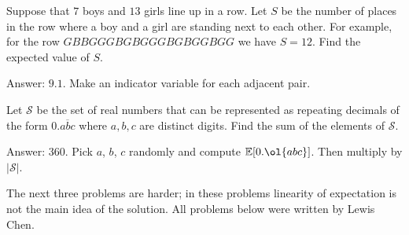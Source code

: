 \documentclass[11pt]{scrartcl}
\newcommand\EE{\mathbb E}
\begin{document}
\begin{problem}
  [AHSME 1989] Suppose that $7$ boys and $13$ girls line up in a row.
  Let $S$ be the number of places in the row where a boy and a girl are standing next to each other.
  For example, for the row $GBBGGGBGBGGGBGBGGBGG$ we have $S = 12$. Find the expected value of $S$.  %
  \begin{sketch}
    Answer: $9.1$. Make an indicator variable for each adjacent pair.
  \end{sketch}
\end{problem}
\begin{problem}
  [AIME 2006 \#6] Let $\mathcal{S}$ be the set of real numbers that can be
  represented as repeating decimals of the form $0.\overline{abc}$ where $a, b, c$ are distinct digits.
  Find the sum of the elements of $\mathcal{S}$. %
  \begin{sketch}
    Answer: $360$. Pick $a$, $b$, $c$ randomly and compute $\EE[0.\ol{abc}]$.
    Then multiply by $\left\lvert \mathcal S \right\rvert$.
  \end{sketch}
\end{problem}

The next three problems are harder; in these problems linearity of expectation
is not the main idea of the solution.
All problems below were written by Lewis Chen.
\end{document}
